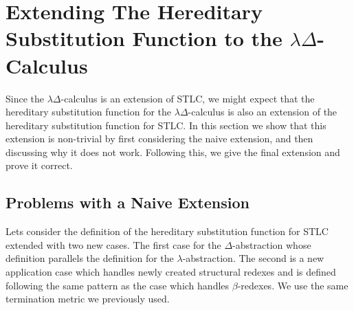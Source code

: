 \section{Extending The Hereditary Substitution Function to the $\lambda\Delta$-Calculus}
\label{sec:the_hereditary_substitution_function_for_the_ld-calculus}
Since the $\lambda\Delta$-calculus is an extension of STLC, we might expect that 
the hereditary substitution function for the $\lambda\Delta$-calculus is also an extension of the
hereditary substitution function for STLC.  In this section we show that this extension is
non-trivial by first considering the naive extension, and then discussing why it does not work.
Following this, we give the final extension and prove it correct.

\subsection{Problems with a Naive Extension}
\label{subsec:the_naive_extension}
Lets consider the definition of the hereditary substitution function
for STLC extended with two new cases. The first case for the $\Delta$-abstraction
whose definition parallels the definition for the
$\lambda$-abstraction.  The second is a new application case which
handles newly created structural redexes and is defined following the
same pattern as the case which handles $\beta$-redexes.  We use the same termination
metric we previously used. 
